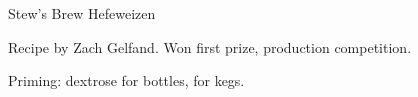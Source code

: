 \begin{recipe}{Stew's Brew Hefeweizen}

\begin{aboutblock}
Recipe by Zach Gelfand. Won first prize, production competition.
\end{aboutblock}


\begin{methodandtiming}
 
\begin{mashsteps}
\end{mashsteps}

\begin{fermentationsteps}
\end{fermentationsteps}

\begin{directions}
Priming:  dextrose for bottles,  for kegs.
\end{directions}

\end{methodandtiming}

\recipebreak

\begin{ingredientsblock}

\begin{malts}
\end{malts}

\begin{hops}
\end{hops}


\end{ingredientsblock}

\end{recipe}

